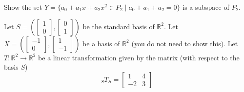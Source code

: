 \documentclass[10pt]{exam}
\begin{document}
\begin{questions}
\question
Show the set $Y = \{ a_0+a_1 x+a_2 x^2 \in P_2 \mid a_0+a_1+a_2=0 \}$ is a subspace of $P_2$.

\question
Let $S=\left( \left[\begin{array}{r} 1 \\ 0 \end{array}\right], \left[\begin{array}{r} 0 \\ 1 \end{array}\right] \right)$ be the standard basis of $\mathbb{R}^2$.  Let $X=\left( \left[\begin{array}{r} -1 \\ 0 \end{array}\right], \left[\begin{array}{r} 1 \\ -1 \end{array}\right] \right)$ be a basis of $\mathbb{R}^2$ (you do not need to show this).  Let $T{:}\mathbb{R}^2\rightarrow \mathbb{R}^2$ be a linear transformation given by the matrix (with respect to the basis $S$)
\[ {}_S T_S =\left[ \begin{array}{rr} 1 & 4 \\ -2 & 3 \end{array}\right]\]



\end{questions}
\end{document}
